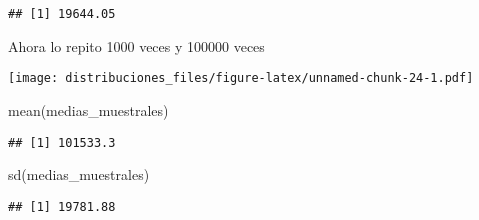 \documentclass[
]{article}
\newenvironment{Shaded}{\begin{snugshade}}{\end{snugshade}}
\newcommand{\AttributeTok}[1]{\textcolor[rgb]{0.77,0.63,0.00}{#1}}
\newcommand{\DecValTok}[1]{\textcolor[rgb]{0.00,0.00,0.81}{#1}}
\newcommand{\FunctionTok}[1]{\textcolor[rgb]{0.00,0.00,0.00}{#1}}
\newcommand{\NormalTok}[1]{#1}
\newcommand{\OtherTok}[1]{\textcolor[rgb]{0.56,0.35,0.01}{#1}}
\newcommand{\SpecialCharTok}[1]{\textcolor[rgb]{0.00,0.00,0.00}{#1}}
\newcommand{\StringTok}[1]{\textcolor[rgb]{0.31,0.60,0.02}{#1}}
\begin{document}
\begin{verbatim}
## [1] 19644.05
\end{verbatim}

Ahora lo repito 1000 veces y 100000 veces

\begin{Shaded}
\end{Shaded}

\texttt{[image: distribuciones\_files/figure-latex/unnamed-chunk-24-1.pdf]}

\begin{Shaded}
\begin{Highlighting}[]
\FunctionTok{mean}\NormalTok{(medias\_muestrales)}
\end{Highlighting}
\end{Shaded}

\begin{verbatim}
## [1] 101533.3
\end{verbatim}

\begin{Shaded}
\begin{Highlighting}[]
\FunctionTok{sd}\NormalTok{(medias\_muestrales)}
\end{Highlighting}
\end{Shaded}

\begin{verbatim}
## [1] 19781.88
\end{verbatim}
\end{document}
